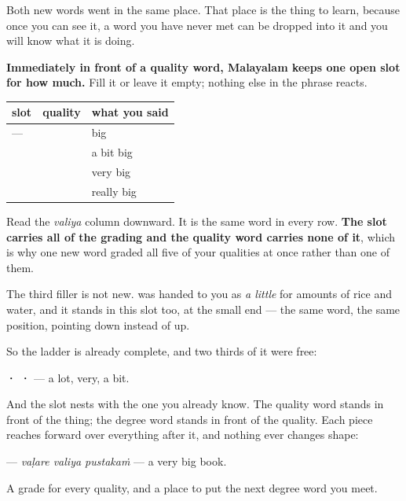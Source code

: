 \begin{grammarlens}[title={Grammar Lens: the position, not the word}]
Both new words went in the same place. That place is the thing to learn, because once you can see it, a word you have never met can be dropped into it and you will know what it is doing.

\textbf{Immediately in front of a quality word, Malayalam keeps one open slot for how much.} Fill it or leave it empty; nothing else in the phrase reacts.

\noindent
\begin{tabularx}{\linewidth}{@{}>{\raggedright\arraybackslash}X>{\raggedright\arraybackslash}X>{\raggedright\arraybackslash}X@{}}
\toprule
\textbf{slot} & \textbf{quality} & \textbf{what you said} \\
\midrule
— & \textbf{\ml{വലിയ}} & big \\
\textbf{\ml{കുറച്ച്}} & \textbf{\ml{വലിയ}} & a bit big \\
\textbf{\ml{വളരെ}} & \textbf{\ml{വലിയ}} & very big \\
\textbf{\ml{ഒരുപാട്}} & \textbf{\ml{വലിയ}} & really big \\
\bottomrule
\end{tabularx}

Read the \emph{valiya} column downward. It is the same word in every row. \textbf{The slot carries all of the grading and the quality word carries none of it}, which is why one new word graded all five of your qualities at once rather than one of them.

The third filler is not new. \textbf{} was handed to you as \emph{a little} for amounts of rice and water, and it stands in this slot too, at the small end — the same word, the same position, pointing down instead of up.

So the ladder is already complete, and two thirds of it were free:

\textbf{ ·  · } — a lot, very, a bit.

And the slot nests with the one you already know. The quality word stands in front of the thing; the degree word stands in front of the quality. Each piece reaches forward over everything after it, and nothing ever changes shape:

\textbf{  } — \emph{vaḷare valiya pustakaṁ} — a very big book.
\end{grammarlens}

\begin{grammarlens}[title={What you've built}]
A grade for every quality, and a place to put the next degree word you meet.
\end{grammarlens}

